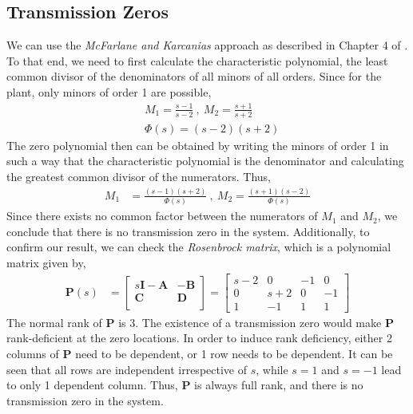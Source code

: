 \subsection{Transmission Zeros}
We can use the \emph{McFarlane and Karcanias} approach as described in Chapter 4 of \cite{Sko05}. To that end, we need to first calculate the characteristic polynomial, the least common divisor of the denominators of all minors of all orders. Since for the plant, only minors of order 1 are possible,
\begin{align*}
    &M_1 = \frac{s - 1}{s - 2} \: , \: M_2 = \frac{s + 1}{s + 2} \\
    &\Phi(s) = (s-2)(s+2)
\end{align*}
The zero polynomial then can be obtained by writing the minors of order 1 in such a way that the characteristic polynomial is the denominator and calculating the greatest common divisor of the numerators. Thus,
\begin{align*}
    M_1 &= \frac{(s - 1)(s + 2)}{\Phi(s)} \: , \: M_2 = \frac{(s + 1)(s - 2)}{\Phi(s)} 
\end{align*}
Since there exists no common factor between the numerators of $M_1$ and $M_2$, we conclude that there is no transmission zero in the system. Additionally, to confirm our result, we can check the \emph{Rosenbrock matrix}, which is a polynomial matrix given by,
\begin{align*}
    \bm{P}(s) &=
    \begin{bmatrix}
        s\bm{I}-\bm{A} & -\bm{B} \\
        \bm{C} & \bm{D} \\
    \end{bmatrix}
    =
    \begin{bmatrix}
        s - 2 & 0 & -1 & 0 \\
        0 & s + 2 & 0 & -1 \\
        1 & -1 & 1 & 1
    \end{bmatrix} 
\end{align*}
The normal rank of $\mathbf{P}$ is 3. The existence of a transmission zero would make $\mathbf{P}$ rank-deficient at the zero locations. In order to induce rank deficiency, either 2 columns of $\mathbf{P}$ need to be dependent, or 1 row needs to be dependent. It can be seen that all rows are independent irrespective of $s$, while $s=1$ and $s=-1$ lead to only 1 dependent column. Thus, $\mathbf{P}$ is always full rank, and there is no transmission zero in the system. \\
